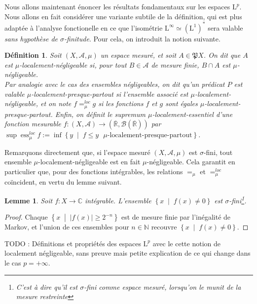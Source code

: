 \documentclass[a4paper,12pt]{article}
\newtheorem{definition}[theorem]{Définition}
\newtheorem{lemma}[theorem]{Lemme}
\newcommand{\R}{\mathbb{R}}
\newcommand{\N}{\mathbb{N}}
\newcommand{\C}{\mathbb{C}}
\newcommand{\Bor}{\mathcal{B}}
\newcommand{\abs}[1]{\left\vert#1\right\vert}
\newcommand{\set}[1]{\left\{ #1 \right\}}
\newcommand{\tq}{\;\middle|\;}
\newcommand{\parts}{\mathfrak{P}}
\newcommand{\TODO}[1]{{\color{red}TODO :} #1}
\DeclareMathOperator{\ess}{ess}
\begin{document}
Nous allons maintenant énoncer les résultats fondamentaux sur les espaces $\mathrm{L}^p$. Nous allons en fait considérer une variante subtile de 
la définition, qui est plus adaptée à l'analyse fonctionelle en ce que l'isométrie $\mathrm{L}^\infty \simeq (\mathrm{L}^1)^*$
sera valable \emph{sans hypothèse de $\sigma$-finitude}. Pour cela, on introduit la notion suivante.

\begin{definition}
    Soit $(X, \mathcal{A}, \mu)$ un espace mesuré, et soit $A\in\parts{X}$. On dit que $A$ est \emph{$\mu$-localement-négligeable} 
    si, pour tout $B\in\mathcal{A}$ \emph{de mesure finie}, $B\cap A$ est $\mu$-négligeable. \\
    Par analogie avec le cas des ensembles négligeables, on dit qu'un prédicat $P$ est valable 
    \emph{$\mu$-localement-presque-partout} si l'ensemble associé est $\mu$-localement-négligeable,
    et on note $f =_\mu^{loc} g$ si les fonctions $f$ et $g$ sont égales $\mu$-localement-presque-partout.
    Enfin, on définit le \emph{supremum $\mu$-localement-essentiel} d'une fonction mesurable $f:(X, \mathcal{A})\to(\overline{\R},\Bor(\overline{\R}))$ par 
    $\sup\ess_\mu^{loc} f := \inf\set{y\tq f\le y\text{ $\mu$-localement-presque-partout}}$.
\end{definition}

Remarquons directement que, si l'espace mesuré $(X, \mathcal{A}, \mu)$ est $\sigma$-fini, 
tout ensemble $\mu$-localement-négligeable est en fait $\mu$-négligeable. Cela garantit en particulier que, 
pour des fonctions intégrables, les relations $=_\mu$ et $=_\mu^{loc}$ coïncident, en vertu du lemme suivant.

\begin{lemma}
    Soit $f:X\to\C$ intégrable. L'ensemble $\set{x\tq f(x)\ne 0}$ est $\sigma$-fini\footnote{C'est à dire qu'il est $\sigma$-fini comme espace mesuré, 
    lorsqu'on le munit de la mesure restreinte}. 
\end{lemma}

\begin{proof}
    Chaque $\set{x\tq \abs{f(x)}\ge 2^{-n}}$ est de mesure finie par l'inégalité de Markov, et l'union de ces ensembles pour 
    $n\in\N$ recouvre $\set{x\tq f(x)\ne 0}$.
\end{proof}

\TODO{Définitions et propriétés des espaces $\mathrm{L}^p$ avec le cette notion de localement négligeable, 
sans preuve mais petite explication de ce qui change dans le cas $p=+\infty$.}
\end{document}
